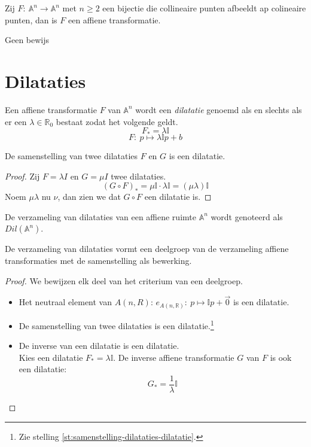 \documentclass[main.tex]{subfiles}
\begin{document}
\begin{st}
  Zij $F:\ \mathbb{A}^{n} \rightarrow \mathbb{A}^{n}$ met $n\ge 2$ een bijectie die collineaire punten afbeeldt ap colineaire punten, dan is $F$ een affiene transformatie.

Geen bewijs
\end{st}

\section{Dilataties}
\label{sec:dilataties}

\begin{de}
  Een affiene transformatie $F$ van $\mathbb{A}^{n}$ wordt een \emph{dilatatie} genoemd als en slechts als er een $\lambda\in \mathbb{R}_{0}$ bestaat zodat het volgende geldt.
  \[ F_{*} = \lambda  \mathbb{I} \]
  \[ F:\ p \mapsto \lambda \mathbb{I} p + b \]
\end{de}

\begin{st}
  \label{st:samenstelling-dilataties-dilatatie}
  De samenstelling van twee dilataties $F$ en $G$ is een dilatatie.
  
  \begin{proof}
    Zij $F=\lambda I$ en $G= \mu I$ twee dilataties.
    \[ (G \circ F)_{*} = \mu \mathbb{I}  \cdot \lambda \mathbb{I} = (\mu\lambda) \mathbb{I} \]
    Noem $\mu\lambda$ nu $\nu$, dan zien we dat $G \circ F$ een dilatatie is.
  \end{proof}
\end{st}

\begin{de}
  De verzameling van dilataties van een affiene ruimte $\mathbb{A}^{n}$ wordt genoteerd als $Dil(\mathbb{A}^{n})$.
\end{de}

\begin{st}
  De verzameling van dilataties vormt een deelgroep van de verzameling affiene transformaties met de samenstelling als bewerking.

  \begin{proof}
    We bewijzen elk deel van het criterium van een deelgroep.
    \begin{itemize}
    \item Het neutraal element van $A(n,R)$: $e_{A(n,\mathbb{R})}:\ p \mapsto \mathbb{I} p + \vec{0}$ is een dilatatie.
    \item De samenstelling van twee dilataties is een dilatatie.\footnote{Zie stelling \ref{st:samenstelling-dilataties-dilatatie}.}
    \item De inverse van een dilatatie is een dilatatie.\\
      Kies een dilatatie $F_{*} = \lambda \mathbb{I} $. De inverse affiene transformatie $G$ van $F$ is ook een dilatatie:
      \[ G_{*} = \frac{1}{\lambda} \mathbb{I}\]
    \end{itemize}
  \end{proof}
\end{st}
\end{document}
